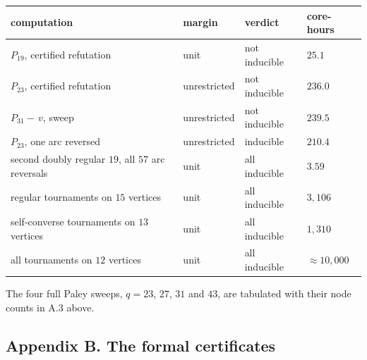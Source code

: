 \documentclass[
]{article}
\newcounter{none} %
\begin{document}
{\def\LTcaptype{none} %
\begin{longtable}[]{@{}
  >{\raggedright\arraybackslash}p{}
  >{\raggedright\arraybackslash}p{}
  >{\raggedright\arraybackslash}p{}
  >{\raggedleft\arraybackslash}p{}@{}}
\toprule\noalign{}
\begin{minipage}[b]{\linewidth}\raggedright
computation
\end{minipage} & \begin{minipage}[b]{\linewidth}\raggedright
margin
\end{minipage} & \begin{minipage}[b]{\linewidth}\raggedright
verdict
\end{minipage} & \begin{minipage}[b]{\linewidth}\raggedleft
core-hours
\end{minipage} \\
\midrule\noalign{}
\endhead
\bottomrule\noalign{}
\endlastfoot
\(P_{19}\), certified refutation & unit & not inducible & \(25.1\) \\
\(P_{23}\), certified refutation & unrestricted & not inducible &
\(236.0\) \\
\(P_{31} -\,v\), sweep & unrestricted & not inducible & \(239.5\) \\
\(P_{23}\), one arc reversed & unrestricted & inducible & \(210.4\) \\
second doubly regular \(19\), all \(57\) arc reversals & unit & all
inducible & \(3.59\) \\
regular tournaments on \(15\) vertices & unit & all inducible &
\(3{,}106\) \\
self-converse tournaments on \(13\) vertices & unit & all inducible &
\(1{,}310\) \\
all tournaments on \(12\) vertices & unit & all inducible &
\(\approx 10{,}000\) \\
\end{longtable}
}

The four full Paley sweeps, \(q = 23\), \(27\), \(31\) and \(43\), are
tabulated with their node counts in A.3 above.

\subsection{Appendix B. The formal
certificates}\label{appendix-b.-the-formal-certificates}
\end{document}
